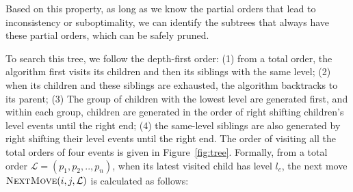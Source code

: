 \documentclass[letterpaper]{article} %
\theoremstyle{definition}
\newtheorem{definition}{Definition}
\newtheorem{lemma}{Lemma}
\newcommand{\LE}{\mathcal{L}}
\begin{document}
Based on this property, as long as we know the partial orders that lead to inconsistency or suboptimality, we can identify the subtrees that always have these partial orders, which can be safely pruned.





To search this tree, we follow the depth-first order: (1) from a total order, the algorithm first visits its children and then its siblings with the same level; (2) when its children and these siblings are exhausted, the algorithm backtracks to its parent; (3) The group of children with the lowest level are generated first, and within each group, children are generated in the order of right shifting children's level events until the right end; (4) the same-level siblings are also generated by right shifting their level events until the right end. The order of visiting all the total orders of four events is given in Figure~\ref{fig:tree}. Formally, from a total order $\LE = (p_1, p_2,..,p_n)$, when its latest visited child has level $l_c$, the next move $
\textsc{NextMove}(i,j,\LE)$ is calculated as follows:
\end{document}
